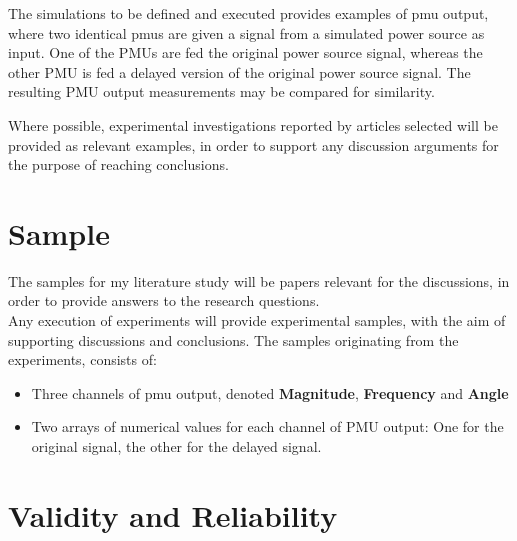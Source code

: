 The simulations to be defined and executed provides examples of \acrlong{pmu} output, where two identical \acrshort{pmu}s are given a signal from a simulated power source as input. One of the PMUs are fed the original power source signal, whereas the other PMU is fed a delayed version of the original power source signal. The resulting PMU output measurements may be compared for similarity. 

Where possible, experimental investigations reported by articles selected will be provided as relevant examples, in order to support any discussion arguments for the purpose of reaching conclusions.  

\section{Sample}

The samples for my literature study will be papers relevant for the discussions, in order to provide answers to the research questions.\\ 

Any execution of experiments will provide experimental samples, with the aim of supporting discussions and conclusions.
The samples originating from the experiments, consists of:
\begin{itemize}
    \item Three channels of \acrshort{pmu} 
    output, denoted \textbf{Magnitude}, \textbf{Frequency} and \textbf{Angle} 
    \item Two arrays of numerical values for each channel of PMU output: One for the original signal, the other for the delayed signal. 
\end{itemize}
\section{Validity and Reliability}

